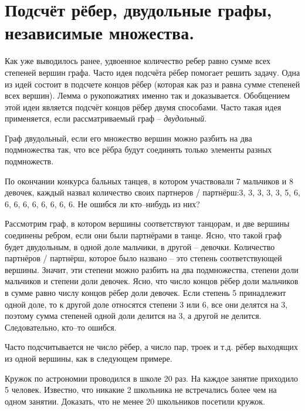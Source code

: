 
\section{Подсчёт рёбер, двудольные графы, независимые множества.}

Как уже выводилось ранее, удвоенное количество ребер равно сумме всех степеней вершин графа. Часто идея подсчёта рёбер помогает решить задачу. Одна из идей состоит в подсчете концов рёбер (которая как раз и равна сумме степеней всех вершин). Лемма о рукопожатиях именно так и доказывается. Обобщением этой идеи является подсчёт концов рёбер двумя способами. Часто такая идея применяется, если рассматриваемый граф -- \textit{двудольный}.

\begin{dfn}
    Граф двудольный, если его множество вершин можно разбить на два подмножества так, что все рёбра будут соединять только элементы разных подмножеств.
\end{dfn}

\begin{thm}
    По окончании конкурса бальных танцев, в котором участвовали 7 мальчиков и 8 девочек, каждый назвал количество своих партнеров / партнёрш:3, 3, 3, 3, 3, 5, 6, 6, 6, 6, 6, 6, 6, 6, 6. Не ошибся ли кто--нибудь из них?
\end{thm}

\begin{prf}
    Рассмотрим граф, в котором вершины соответствуют танцорам, и две вершины соединены ребром, если они были партнёрами в танце. Ясно, что такой граф будет двудольным, в одной доле мальчики, в другой -- девочки. Количество партнёров / партнёрш, которое было названо -- это степень соответствующей вершины. Значит, эти степени можно разбить на два подмножества, степени доли мальчиков и степени доли девочек. Ясно, что число концов рёбер доли мальчиков в сумме равно числу концов рёбер доли девочек. Если степень 5 принадлежит одной доле, то к другой доле относятся степени 3 или 6, все они делятся на 3, поэтому сумма степеней одной доли делится на 3, а другой не делится. Следовательно, кто--то ошибся.  
\end{prf}

Часто подсчитывается не число рёбер, а число пар, троек и т.д. рёбер выходящих из одной вершины, как в следующем примере.

\begin{thm}
    Кружок по астрономии проводился в школе 20 раз. На каждое занятие приходило 5 человек. Известно, что никакие 2 школьника не встречались более чем на одном занятии. Доказать, что не менее 20 школьников посетили кружок.
\end{thm}

